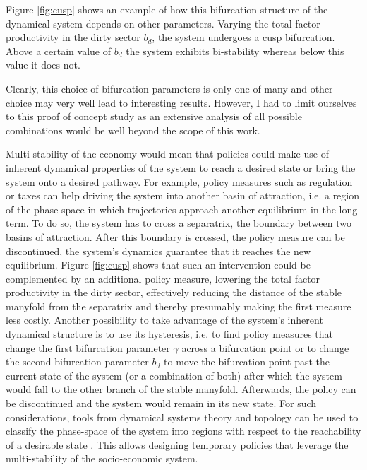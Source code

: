 Figure \ref{fig:cusp} shows an example of how this bifurcation structure of the dynamical system depends on other parameters. Varying the total factor productivity in the dirty sector $b_d$, the system undergoes a cusp bifurcation. Above a certain value of $b_d$ the system exhibits bi-stability whereas below this value it does not.


Clearly, this choice of bifurcation parameters is only one of many and other choice may very well lead to interesting results. However, I had to limit ourselves to this proof of concept study as an extensive analysis of all possible combinations would be well beyond the scope of this work.


Multi-stability of the economy would mean that policies could make use of inherent dynamical properties of the system to reach a desired state or bring the system onto a desired pathway. For example, policy measures such as regulation or taxes can help driving the system into another basin of attraction, i.e. a region of the phase-space in which trajectories approach another equilibrium in the long term. To do so, the system has to cross a separatrix, the boundary between two basins of attraction.
After this boundary is crossed, the policy measure can be discontinued, the system's dynamics guarantee that it reaches the new equilibrium. 
Figure \ref{fig:cusp} shows that such an intervention could be complemented by an additional policy measure, lowering the total factor productivity in the dirty sector, effectively reducing the distance of the stable manyfold from the separatrix and thereby presumably making the first measure less costly.
Another possibility to take advantage of the system's inherent dynamical structure is to use its hysteresis, i.e. to find policy measures that change the first bifurcation parameter $\gamma$ across a bifurcation point or to change the second bifurcation parameter $b_d$ to move the bifurcation point past the current state of the system (or a combination of both) after which the system would fall to the other branch of the stable manyfold. Afterwards, the policy can be discontinued and the system would remain in its new state.
For such considerations, tools from dynamical systems theory and topology can be used to classify the phase-space of the system into regions with respect to the reachability of a desirable state \citep{Heitzig2016,Nitzbon2017}. This allows designing temporary policies that leverage the multi-stability of the socio-economic system.


